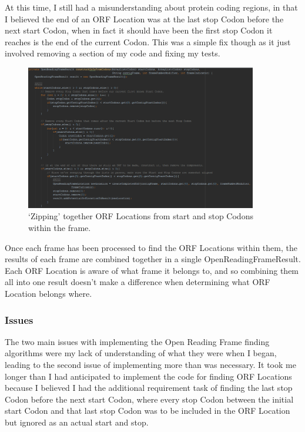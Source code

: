 At this time, I still had a misunderstanding about protein coding regions, in that I believed the end of an ORF Location was at the last stop Codon before the next start Codon, when in fact it should have been the first stop Codon it reaches is the end of the current Codon. This was a simple fix though as it just involved removing a section of my code and fixing my tests.

\begin{figure}[H]
\centering
\includegraphics[width=0.9\textwidth]{images/orffind3}
\caption{`Zipping' together ORF Locations from start and stop Codons within the frame.}
\end{figure}

Once each frame has been processed to find the ORF Locations within them, the results of each frame are combined together in a single OpenReadingFrameResult. Each ORF Location is aware of what frame it belongs to, and so combining them all into one result doesn't make a difference when determining what ORF Location belongs where.

\subsubsection{Issues}
The two main issues with implementing the Open Reading Frame finding algorithms were my lack of understanding of what they were when I began, leading to the second issue of implementing more than was necessary. It took me longer than I had anticipated to implement the code for finding ORF Locations because I believed I had the additional requirement task of finding the last stop Codon before the next start Codon, where every stop Codon between the initial start Codon and that last stop Codon was to be included in the ORF Location but ignored as an actual start and stop.

